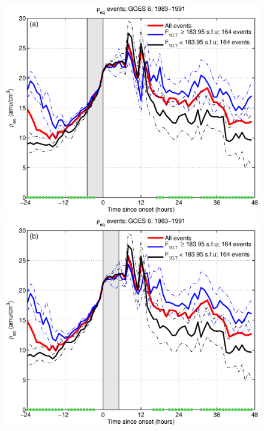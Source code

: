 \documentclass[12pt]{article}
\begin{document}
	\begin{figure}[tp!]
		\centering
		\includegraphics[scale=0.40]{2016SW001507R-p09a.eps}
		\includegraphics[scale=0.40]{2016SW001507R-p09b.eps}
	\end{figure}
	
	
\end{document}
